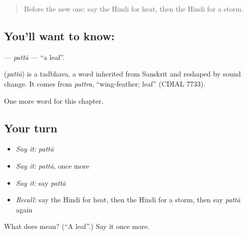 \label{lesson:HI-C185-patta}



\begin{quote}
Before the new one: say the Hindi for heat, then the Hindi for a storm.
\end{quote}

\subsection*{You'll want to know: }
\textbf{} — \emph{pattā} — \textquotedblleft{}a leaf\textquotedblright{}.

\begin{cousinweb}
\textbf{} (\emph{pattā}) is a tadbhava, a word inherited from Sanskrit and reshaped by sound change. It comes from \emph{pattra}, \textquotedblleft{}wing-feather; leaf\textquotedblright{} (CDIAL 7733).
\end{cousinweb}

\begin{grammarlens}[title={What you've built}]
One more word for this chapter.
\end{grammarlens}

\subsection*{Your turn}
\begin{itemize}
\raggedright
  \item \emph{Say it:} \emph{pattā}
  \item \emph{Say it:} \emph{pattā}, once more
  \item \emph{Say it:} say \emph{pattā}
  \item \emph{Recall:} say the Hindi for heat, then the Hindi for a storm, then say \emph{pattā} again
\end{itemize}

\begin{tcolorbox}[breakable,colback=teal!4,colframe=teal!35!black,title={Before you move on}]
What does  mean? (\textquotedblleft{}A leaf\textquotedblright{}.) Say it once more.
\end{tcolorbox}
